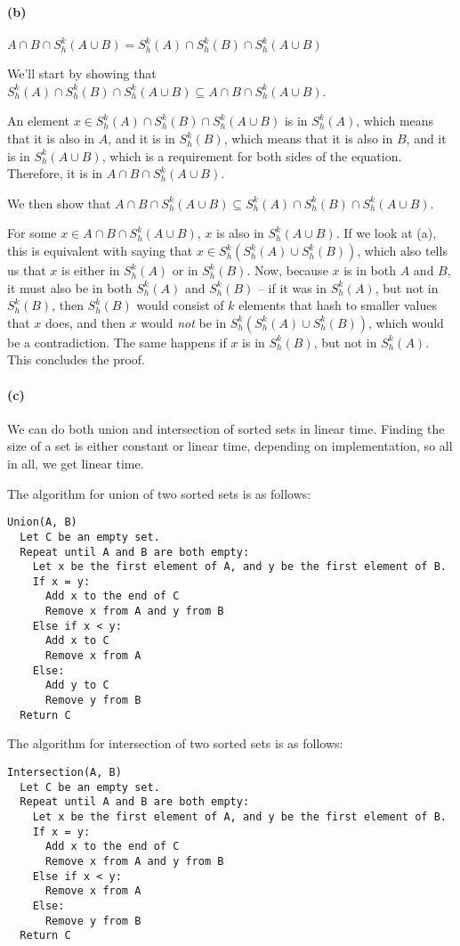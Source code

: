 \paragraph*{(b)}
$A \cap B \cap S^k_h(A \cup B) = S^k_h(A) \cap S^k_h(B) \cap S^k_h(A \cup B)$

We'll start by showing that $S^k_h(A) \cap S^k_h(B) \cap S^k_h(A \cup B) \subseteq A \cap B \cap S^k_h(A \cup B)$.

An element $x \in S^k_h(A) \cap S^k_h(B) \cap S^k_h(A \cup B)$ is in $S^k_h(A)$, which means that it is also in $A$, and it is in $S^k_h(B)$, which means that it is also in $B$, and it is in $S^k_h(A \cup B)$, which is a requirement for both sides of the equation. Therefore, it is in $A \cap B \cap S^k_h(A \cup B)$.

We then show that $A \cap B \cap S^k_h(A \cup B) \subseteq S^k_h(A) \cap S^k_h(B) \cap S^k_h(A \cup B)$.

For some $x \in A \cap B \cap S^k_h(A \cup B)$, $x$ is also in $S^k_h(A \cup B)$. If we look at (a), this is equivalent with saying that $x \in S^k_h(S^k_h(A) \cup S^k_h(B))$, which also tells us that $x$ is either in $S^k_h(A)$ or in $S^k_h(B)$. Now, because $x$ is in both $A$ and $B$, it must also be in both $S^k_h(A)$ and $S^k_h(B)$ -- if it was in $S^k_h(A)$, but not in $S^k_h(B)$, then $S^k_h(B)$ would consist of $k$ elements that hash to smaller values that $x$ does, and then $x$ would \emph{not} be in $S^k_h(S^k_h(A) \cup S^k_h(B))$, which would be a contradiction. The same happens if $x$ is in $S^k_h(B)$, but not in $S^k_h(A)$. This concludes the proof.

\paragraph*{(c)}
We can do both union and intersection of sorted sets in linear time. Finding the size of a set is either constant or linear time, depending on implementation, so all in all, we get linear time.

The algorithm for union of two sorted sets is as follows:

\begin{verbatim}
Union(A, B)
  Let C be an empty set.
  Repeat until A and B are both empty:
    Let x be the first element of A, and y be the first element of B.
    If x = y:
      Add x to the end of C
      Remove x from A and y from B
    Else if x < y:
      Add x to C
      Remove x from A
    Else:
      Add y to C
      Remove y from B
  Return C
\end{verbatim}

The algorithm for intersection of two sorted sets is as follows:

\begin{verbatim}
Intersection(A, B)
  Let C be an empty set.
  Repeat until A and B are both empty:
    Let x be the first element of A, and y be the first element of B.
    If x = y:
      Add x to the end of C
      Remove x from A and y from B
    Else if x < y:
      Remove x from A
    Else:
      Remove y from B
  Return C
\end{verbatim}
